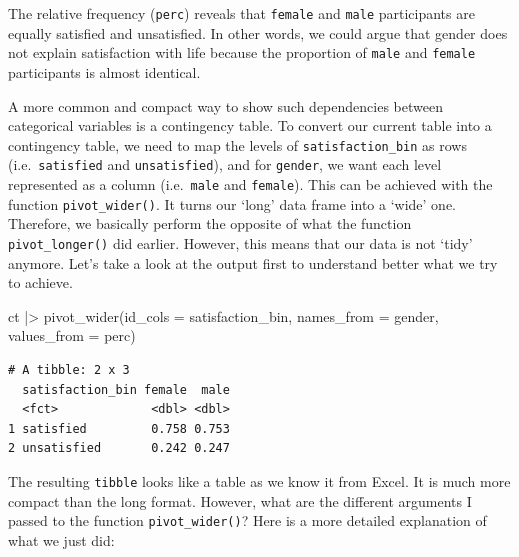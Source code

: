 \documentclass[
  letterpaper,
]{krantz}
\makeatletter
\newenvironment{Shaded}{\begin{snugshade}}{\end{snugshade}}
\newcommand{\AttributeTok}[1]{\textcolor[rgb]{0.40,0.45,0.13}{#1}}
\newcommand{\FunctionTok}[1]{\textcolor[rgb]{0.28,0.35,0.67}{#1}}
\newcommand{\NormalTok}[1]{\textcolor[rgb]{0.00,0.23,0.31}{#1}}
\newcommand{\SpecialCharTok}[1]{\textcolor[rgb]{0.37,0.37,0.37}{#1}}
\newenvironment{kframe}{%
\medskip{}
\setlength{\fboxsep}{.8em}
 \def\at@end@of@kframe{}%
 \ifinner\ifhmode%
  \def\at@end@of@kframe{\end{minipage}}%
  \begin{minipage}{\columnwidth}%
 \fi\fi%
 \def\FrameCommand##1{\hskip\@totalleftmargin \hskip-\fboxsep
 \colorbox{shadecolor}{##1}\hskip-\fboxsep
     \hskip-\linewidth \hskip-\@totalleftmargin \hskip\columnwidth}%
 \MakeFramed {\advance\hsize-\width
   \@totalleftmargin\z@ \linewidth\hsize
   \@setminipage}}%
 {\par\unskip\endMakeFramed%
 \at@end@of@kframe}
\renewenvironment{Shaded}{\begin{kframe}}{\end{kframe}}
\makeatother
\begin{document}
The relative frequency (\texttt{perc}) reveals that \texttt{female} and
\texttt{male} participants are equally satisfied and unsatisfied. In
other words, we could argue that gender does not explain satisfaction
with life because the proportion of \texttt{male} and \texttt{female}
participants is almost identical.

A more common and compact way to show such dependencies between
categorical variables is a contingency table. To convert our current
table into a contingency table, we need to map the levels of
\texttt{satisfaction\_bin} as rows (i.e.~\texttt{satisfied} and
\texttt{unsatisfied}), and for \texttt{gender}, we want each level
represented as a column (i.e.~\texttt{male} and \texttt{female}). This
can be achieved with the function \texttt{pivot\_wider()}. It turns our
`long' data frame into a `wide' one. Therefore, we basically perform the
opposite of what the function \texttt{pivot\_longer()} did earlier.
However, this means that our data is not `tidy' anymore. Let's take a
look at the output first to understand better what we try to achieve.

\begin{Shaded}
\begin{Highlighting}[]
\NormalTok{ct }\SpecialCharTok{|\textgreater{}} \FunctionTok{pivot\_wider}\NormalTok{(}\AttributeTok{id\_cols =}\NormalTok{ satisfaction\_bin,}
                   \AttributeTok{names\_from =}\NormalTok{ gender,}
                   \AttributeTok{values\_from =}\NormalTok{ perc)}
\end{Highlighting}
\end{Shaded}

\begin{verbatim}
# A tibble: 2 x 3
  satisfaction_bin female  male
  <fct>             <dbl> <dbl>
1 satisfied         0.758 0.753
2 unsatisfied       0.242 0.247
\end{verbatim}

The resulting \texttt{tibble} looks like a table as we know it from
Excel. It is much more compact than the long format. However, what are
the different arguments I passed to the function
\texttt{pivot\_wider()}? Here is a more detailed explanation of what we
just did:
\end{document}
